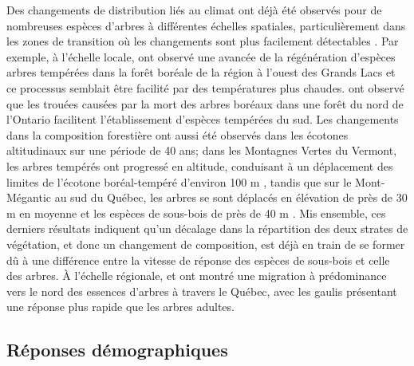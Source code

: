 Des changements de distribution liés au climat ont déjà été observés
pour de nombreuses espèces d'arbres à différentes échelles spatiales,
particulièrement dans les zones de transition où les changements sont
plus facilement détectables
\citep{jump_altitude-for-latitude_2009, boulanger_climate_2017}. Par
exemple, à l'échelle locale, \citet{fisichelli_temperate_2014} ont
observé une avancée de la régénération d'espèces arbres tempérées dans
la forêt boréale de la région à l'ouest des Grands Lacs et ce processus
semblait être facilité par des températures plus chaudes.
\citet{leithead_northward_2010} ont observé que les trouées causées par
la mort des arbres boréaux dans une forêt du nord de l'Ontario
facilitent l'établissement d'espèces tempérées du sud. Les changements
dans la composition forestière ont aussi été observés dans les écotones
altitudinaux sur une période de 40 ans; dans les Montagnes Vertes du
Vermont, les arbres tempérés ont progressé en altitude, conduisant à un
déplacement des limites de l'écotone boréal-tempéré d'environ 100 m
\citep{beckage_rapid_2008}, tandis que sur le Mont-Mégantic au sud du
Québec, les arbres se sont déplacés en élévation de près de 30 m en
moyenne et les espèces de sous-bois de près de 40 m
\citep{savage_elevational_2015}. Mis ensemble, ces derniers résultats
indiquent qu'un décalage dans la répartition des deux strates de
végétation, et donc un changement de composition, est déjà en train de
se former dû à une différence entre la vitesse de réponse des espèces de
sous-bois et celle des arbres. À l'échelle régionale,
\citet{boisvert-marsh_shifting_2014} et \citet{sittaro_tree_2017} ont
montré une migration à prédominance vers le nord des essences d'arbres à
travers le Québec, avec les gaulis présentant une réponse plus rapide
que les arbres adultes.

\hypertarget{ruxe9ponses-duxe9mographiques}{%
\subsection{Réponses
démographiques}\label{ruxe9ponses-duxe9mographiques}}

